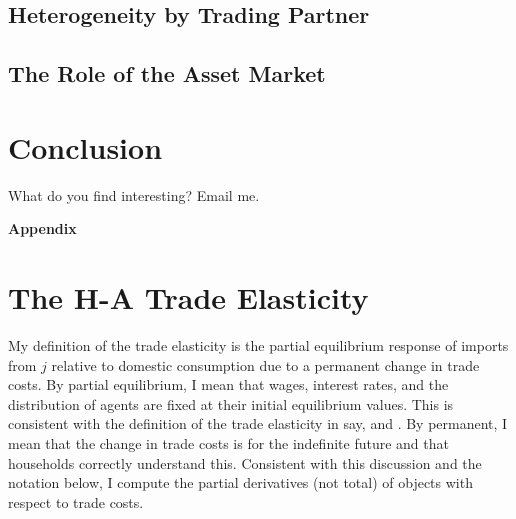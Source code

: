 \documentclass[12pt,pdftex]{article}
\begin{document}
\begin{onehalfspacing}
\subsection{Heterogeneity by Trading Partner}




\subsection{The Role of the Asset Market}\label{sec:asset-market}


\section{Conclusion}

What do you find interesting? Email me.



\appendix

\clearpage
\newpage

\begin{center}
\textbf{\Large Appendix}
\end{center}


\section{The H-A Trade Elasticity}

My definition of the trade elasticity is the partial equilibrium response of imports from $j$ relative to domestic consumption due to a permanent change in trade costs. By partial equilibrium, I mean that wages, interest rates, and the distribution of agents are fixed at their initial equilibrium values. This is consistent with the definition of the trade elasticity in say, \citet{arkolakis2012new} and \citet{simonovska2014elasticity}. By permanent, I mean that the change in trade costs is for the indefinite future and that households correctly understand this. Consistent with this discussion and the notation below, I compute the partial derivatives (not total) of objects with respect to trade costs.


\end{onehalfspacing}
\end{document}
